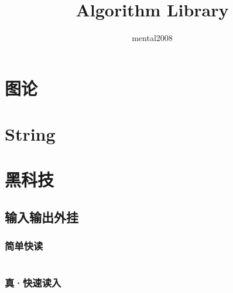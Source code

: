 \documentclass[a4paper,11pt]{article}
\author{mental2008}
\title{Algorithm Library}
\begin{document}
 
\maketitle %

\newpage %
\tableofcontents %

\newpage
\section{图论} %


\newpage
\section{String}

\newpage
\section{黑科技}
\subsection{输入输出外挂}
\subsubsection{简单快读}
\inputminted[breaklines]{c++}{黑科技/QuickIO.cpp}
\subsubsection{真·快速读入}
\inputminted[breaklines]{c++}{黑科技/FastIO.cpp}


\end{document}
